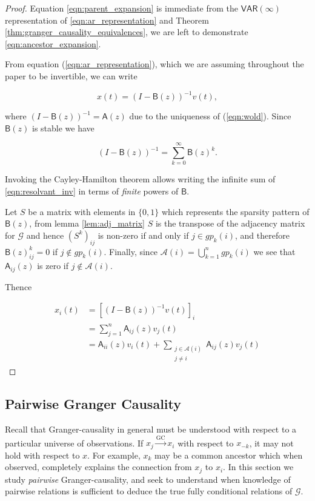 \documentclass[12pt]{article}
\def\gc{\overset{\text{GC}}{\rightarrow}}  %
\def\gcg{\mathcal{G}}  %
\def\VAR{\mathsf{VAR}}  %
\def\B{\mathsf{B}}  %
\def\A{\mathsf{A}}  %
\newcommand{\anc}[1]{\mathcal{A}(#1)}  %
\newcommand{\gpn}[2]{gp_{#1}(#2)}  %
\begin{document}
\begin{proof}
  Equation \eqref{eqn:parent_expansion} is immediate from the
  $\VAR(\infty)$ representation of \eqref{eqn:ar_representation} and
  Theorem \ref{thm:granger_causality_equivalences}, we are left to
  demonstrate \eqref{eqn:ancestor_expansion}.
  
  From equation (\ref{eqn:ar_representation}), which we are assuming
  throughout the paper to be invertible, we can write

  \begin{equation*}
    x(t) = (I - \B(z))^{-1} v(t),
  \end{equation*}

  where $(I - \B(z))^{-1} = \A(z)$ due to the uniqueness of
  (\ref{eqn:wold}).  Since $\B(z)$ is stable we have

  \begin{equation}
    \label{eqn:resolvant_inv}
    (I - \B(z))^{-1} = \sum_{k = 0}^\infty \B(z)^k.
  \end{equation}

  Invoking the Cayley-Hamilton theorem allows writing the infinite sum
  of \eqref{eqn:resolvant_inv} in terms of \textit{finite} powers of
  $\B$.

  Let $S$ be a matrix with elements in $\{0, 1\}$ which represents the
  sparsity pattern of $\B(z)$, from lemma \ref{lem:adj_matrix} $S$ is
  the transpose of the adjacency matrix for $\gcg$ and hence
  $(S^k)_{ij}$ is non-zero if and only if $j \in \gpn{k}{i}$, and
  therefore $\B(z)^k_{ij} = 0$ if $j \not \in \gpn{k}{i}$.  Finally,
  since $\anc{i} = \bigcup_{k = 1}^n\gpn{k}{i}$ we see that
  $\A_{ij}(z)$ is zero if $j \not\in \anc{i}$.

  Thence

  \begin{align*}
    x_i(t) &= [(I - \B(z))^{-1}v(t)]_i\\
    &= \sum_{j = 1}^n \A_{ij}(z) v_j(t)\\
    &= \A_{ii}(z) v_i(t) + \sum_{\substack{j \in \anc{i} \\ j \ne i}} \A_{ij}(z) v_j(t)
  \end{align*}
\end{proof}

\subsection{Pairwise Granger Causality}
\label{sec:pwgc}
Recall that Granger-causality in general must be understood with
respect to a particular universe of observations.  If $x_j \gc x_i$
with respect to $x_{-k}$, it may not hold with respect to $x$.  For
example, $x_k$ may be a common ancestor which when observed, completely
explains the connection from $x_j$ to $x_i$.  In this section we study
\textit{pairwise} Granger-causality, and seek to understand when
knowledge of pairwise relations is sufficient to deduce the true fully
conditional relations of $\gcg$.
\end{document}
